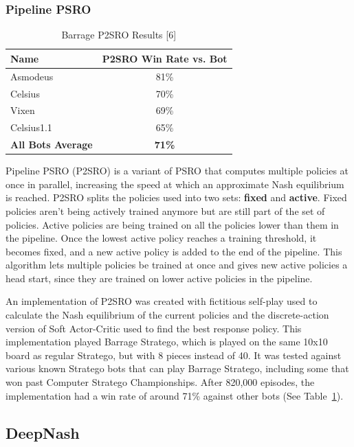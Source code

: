\documentclass{article}
\begin{document}
\subsubsection{Pipeline PSRO}

\begin{table}
  \caption{Barrage P2SRO Results [6]}
  \label{p2sro-results}
  \centering
  \begin{tabular}{lc}
    \toprule
    Name		& P2SRO Win Rate vs. Bot \\ \midrule
    Asmodeus		& 81\% \\
    Celsius		& 70\% \\
    Vixen		& 69\% \\
    Celsius1.1 	& 65\% \\
    \textbf{All Bots Average} 	& \textbf{71\%} \\
    \bottomrule
  \end{tabular}
\end{table}

Pipeline PSRO (P2SRO) is a variant of PSRO that computes multiple policies at once in parallel, increasing the speed at which an approximate Nash equilibrium is reached. 
P2SRO splits the policies used into two sets: \textbf{fixed} and \textbf{active}. Fixed policies aren’t being actively trained anymore but are still part of the set of policies. 
Active policies are being trained on all the policies lower than them in the pipeline. Once the lowest active policy reaches a training threshold, it becomes fixed, and a new active policy is added to the end of the pipeline. 
This algorithm lets multiple policies be trained at once and gives new active policies a head start, since they are trained on lower active policies in the pipeline.

An implementation of P2SRO was created with fictitious self-play used to calculate the Nash equilibrium of the current policies and the discrete-action version of Soft Actor-Critic used to find the best response policy. 
This implementation played Barrage Stratego, which is played on the same 10x10 board as regular Stratego, but with 8 pieces instead of 40.  
It was tested against various known Stratego bots that can play Barrage Stratego, including some that won past Computer Stratego Championships. 
After 820,000 episodes, the implementation had a win rate of around 71\% against other bots (See Table~\ref{p2sro-results}). 

\subsection{DeepNash}
\end{document}
